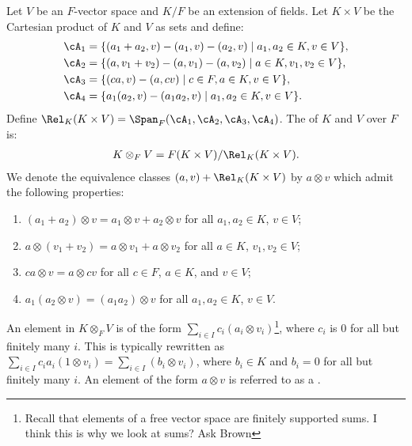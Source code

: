     \begin{definition}
        Let $V$ be an $F$-vector space and $K/F$ be an extension of fields. Let $K \times V$ be the Cartesian product of $K$ and $V$ as sets and define:
            \begin{equation*}
            \begin{split}
                \cA_1 &= \{(a_1 + a_2,v)-(a_1,v)-(a_2,v) \mid a_1,a_2 \in K, v\in V\}, \\
                \cA_2 &= \{(a,v_1 + v_2) - (a,v_1) - (a,v_2) \mid a \in K, v_1,v_2 \in V\}, \\
                \cA_3 &= \{(ca,v) - (a,cv) \mid c \in F, a \in K, v\in V\}, \\
                \cA_4 &= \{a_1(a_2,v) - (a_1 a_2,v) \mid a_1,a_2 \in K,v \in V\}.
            \end{split}
            \end{equation*}
        Define $\Rel_K(K \times V) = \Span_F(\cA_1,\cA_2,\cA_3,\cA_4)$. The  of $K$ and $V$ over $F$ is:
            \begin{equation*}
            \begin{split}
                K \otimes_F V = F(K \times V)/\Rel_K(K \times V).
            \end{split}
            \end{equation*}
        We denote the equivalence classes $(a,v) + \Rel_K(K \times V)$ by $a \otimes v$ which admit the following properties:
            \begin{enumerate}[label = (\arabic*)]
                \item $(a_1 + a_2) \otimes v = a_1 \otimes v + a_2 \otimes v$ for all $a_1,a_2 \in K$, $v \in V$;
                \item $a \otimes (v_1 + v_2) = a \otimes v_1 + a \otimes v_2$ for all $a \in K$, $v_1,v_2 \in V$;
                \item $ca \otimes v = a \otimes cv$ for all $c \in F$, $a \in K$, and $v \in V$;
                \item $a_1(a_2 \otimes v) = (a_1 a_2)\otimes v$ for all $a_1,a_2 \in K$, $v \in V$.
            \end{enumerate}
        An element in $K \otimes_F V$ is of the form $\sum_{i \in I}c_i(a_i \otimes v_i)$\footnote{Recall that elements of a free vector space are finitely supported sums. I think this is why we look at sums? Ask Brown}, where $c_i$ is $0$ for all but finitely many $i$. This is typically rewritten as $\sum_{i \in I}c_i a_i(1 \otimes v_i) = \sum_{i \in I}(b_i \otimes v_i)$, where $b_i \in K$ and $b_i = 0$ for all but finitely many $i$. An element of the form $a \otimes v$ is referred to as a .
    \end{definition}

